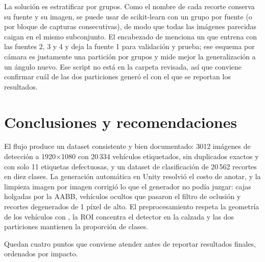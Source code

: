 \documentclass[11pt,a4paper]{article}
\begin{document}
La solución es estratificar por grupos. Como el nombre de cada recorte conserva su fuente y su imagen, se puede usar  de scikit-learn con un grupo por fuente (o por bloque de capturas consecutivas), de modo que todas las imágenes parecidas caigan en el mismo subconjunto. El encabezado de  menciona un  que entrena con las fuentes 2, 3 y 4 y deja la fuente 1 para validación y prueba; ese esquema por cámara es justamente una partición por grupos y mide mejor la generalización a un ángulo nuevo. Ese script no está en la carpeta revisada, así que conviene confirmar cuál de las dos particiones generó el  con el que se reportan los resultados.

\section{Conclusiones y recomendaciones}

El flujo produce un dataset consistente y bien documentado: 3012 imágenes de detección a 1920$\times$1080 con 20\,334 vehículos etiquetados, sin duplicados exactos y con solo 11 etiquetas defectuosas, y un dataset de clasificación de 20\,562 recortes en diez clases. La generación automática en Unity resolvió el costo de anotar, y la limpieza imagen por imagen corrigió lo que el generador no podía juzgar: cajas holgadas por la AABB, vehículos ocultos que pasaron el filtro de oclusión y recortes degenerados de 1 píxel de alto. El preprocesamiento respeta la geometría de los vehículos con , la ROI concentra el detector en la calzada y las dos particiones mantienen la proporción de clases.

Quedan cuatro puntos que conviene atender antes de reportar resultados finales, ordenados por impacto.
\end{document}
